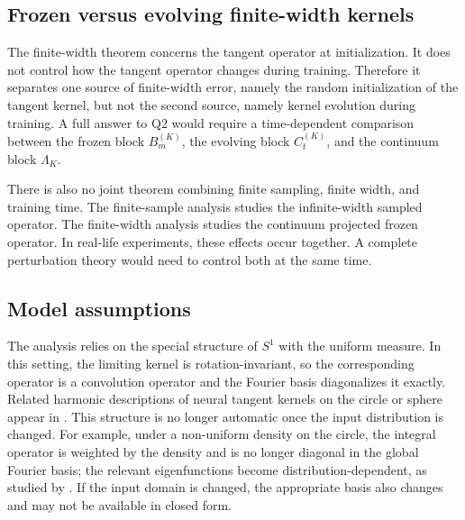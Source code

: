 \subsection{Frozen versus evolving finite-width kernels}
\label{subsec:discussion-limitations-evolving}

The finite-width theorem concerns the tangent operator at initialization. It
does not control how the tangent operator changes during training. Therefore it
separates one source of finite-width error, namely the random initialization of
the tangent kernel, but not the second source, namely kernel evolution during
training. A full answer to Q2 would require a time-dependent comparison between
the frozen block \(B_m^{(K)}\), the evolving block \(C_t^{(K)}\), and the
continuum block \(\Lambda_K\).

There is also no joint theorem combining finite sampling, finite width, and
training time. The finite-sample analysis studies the infinite-width sampled
operator. The finite-width analysis studies the continuum projected frozen
operator. In real-life experiments, these effects occur together. A complete
perturbation theory would need to control both at the same time.

\subsection{Model assumptions}
\label{subsec:discussion-limitations-model}

The analysis relies on the special structure of \(S^1\) with the uniform
measure. In this setting, the limiting kernel is rotation-invariant, so the
corresponding operator is a convolution operator and the Fourier basis
diagonalizes it exactly. Related harmonic descriptions of neural tangent kernels
on the circle or sphere appear in
\citet{basri2019convergence,basri2020frequencybiasneuralnetworks,bietti2019inductivebiasneuraltangent,cao2020understandingspectralbiasdeep}.
This structure is no longer automatic once the input distribution is changed.
For example, under a non-uniform density on the circle, the integral operator is
weighted by the density and is no longer diagonal in the global Fourier basis;
the relevant eigenfunctions become distribution-dependent, as studied by
\citet{basri2020frequencybiasneuralnetworks}. If the input domain is changed,
the appropriate basis also changes and may not be available in closed form.


